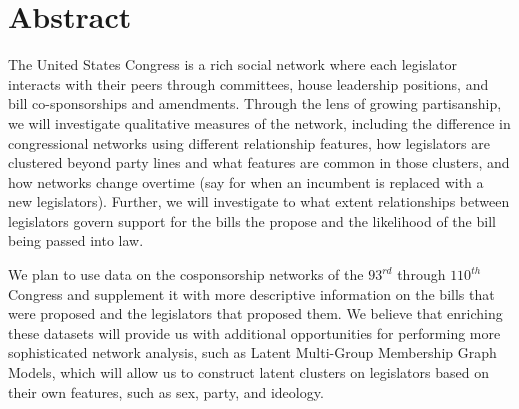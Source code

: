 \section{Abstract}

The United States Congress is a rich social network where each legislator
interacts with their peers through committees, house leadership positions, and
bill co-sponsorships and amendments. Through the lens of growing partisanship,
we will investigate qualitative measures of the network, including the
difference in congressional networks using different relationship features, how
legislators are clustered beyond party lines and what features are common in
those clusters, and how networks change overtime (say for when an incumbent is
replaced with a new legislators). Further, we will investigate to what extent
relationships between legislators govern support for the bills the propose and
the likelihood of the bill being passed into law.

We plan to use data on the cosponsorship networks of the $93^{rd}$ through
$110^{th}$ Congress and supplement it with more descriptive information on the
bills that were proposed and the legislators that proposed them. We believe that
enriching these datasets will provide us with additional opportunities for
performing more sophisticated network analysis, such as Latent Multi-Group
Membership Graph Models, which will allow us to construct latent clusters on
legislators based on their own features, such as sex, party, and ideology.
